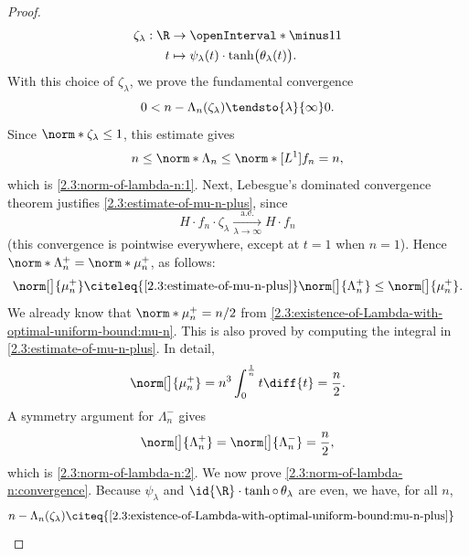\begin{proof}
\begin{align}
  \zeta_\lambda: \R &\to \openInterval*{\minus 1}{1} \\
                  t &\mapsto \psi_\lambda(t) \cdot \tanh\bigl(\theta_\lambda(t)\bigr). \nonumber
\end{align}
%
With this choice of $\zeta_\lambda$, we prove the fundamental convergence
%
\begin{equation}\label{2.3:norm-of-lambda-n:convergence}
  0 < n- \Lambda_n (\zeta_\lambda) \tendsto{\lambda}{\infty} 0. 
\end{equation}
%
Since $\norm*{\zeta_\lambda} \leq 1$, this estimate gives %
%
\begin{equation}
  n \leq \norm*{\Lambda_n} \leq \norm*[L^1]{f_n} = n, 
\end{equation}
%
which is \eqref{2.3:norm-of-lambda-n:1}. Next, Lebesgue's dominated convergence theorem justifies %
\eqref{2.3:estimate-of-mu-n-plus}, since
%
\begin{equation}
  H \cdot f_n \cdot \zeta_\lambda \xrightarrow[\lambda \to \infty]{\text{a.e.}} H \cdot f_n
\end{equation}
%
(this convergence is pointwise everywhere, except at $t=1$ when $n=1$). Hence $\norm*{\Lambda_{n}^{+}} = \norm*{\mu_{n}^{+}}$, 
as follows:
%
\begin{equation}
  \norm[\big]{\mu_{n}^{+}}     \citeleq{\eqref{2.3:estimate-of-mu-n-plus}} 
  \norm[\big]{\Lambda_{n}^{+}} \leq 
  \norm[\big]{\mu_{n}^{+}}.
\end{equation}
%
We already know that $\norm*{\mu_{n}^{+}} = n/2$ from %
\eqref{2.3:existence-of-Lambda-with-optimal-uniform-bound:mu-n}. This is also proved by computing the integral in %
\eqref{2.3:estimate-of-mu-n-plus}. In detail, 
%
\begin{equation}\label{2.3:existence-of-Lambda-with-optimal-uniform-bound:mu-n-plus}
  \norm[\big]{\mu_{n}^{+}} = n^3 \int_{0}^{\frac{1}{n}} t \diff{t} = \frac{n}{2}. 
\end{equation}
%
A symmetry argument for $\Lambda_n^-$ gives
%
\begin{equation}
  \norm[\big]{\Lambda_{n}^{+}} = \norm[\big]{\Lambda_{n}^{-}} = \frac{n}{2}, 
\end{equation}
%
which is \eqref{2.3:norm-of-lambda-n:2}. We now prove \eqref{2.3:norm-of-lambda-n:convergence}.
\skipline
Because $\psi_\lambda$ and $\id{\R} \cdot \tanh \circ \, \theta_\lambda$ are even, we have, for all $n$,
% 
\begin{align}
  n - \Lambda_n (\zeta_\lambda ) &\citeq{\eqref{2.3:existence-of-Lambda-with-optimal-uniform-bound:mu-n-plus}}  %

\end{align}
\end{proof}
